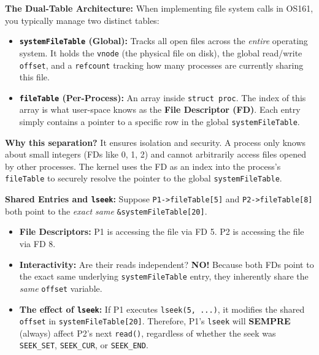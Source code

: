 \begin{tcolorbox}[colback=blue!5!white,colframe=blue!75!black,title=Exam Insight: System File Table vs User File Table (e.g. Q5 2022-06-20)]
\textbf{The Dual-Table Architecture:} When implementing file system calls in OS161, you typically manage two distinct tables:
\begin{itemize}
    \item \textbf{\texttt{systemFileTable} (Global):} Tracks all open files across the \textit{entire} operating system. It holds the \texttt{vnode} (the physical file on disk), the global read/write \texttt{offset}, and a \texttt{refcount} tracking how many processes are currently sharing this file.
    \item \textbf{\texttt{fileTable} (Per-Process):} An array inside \texttt{struct proc}. The index of this array is what user-space knows as the \textbf{File Descriptor (FD)}. Each entry simply contains a pointer to a specific row in the global \texttt{systemFileTable}.
\end{itemize}
\textbf{Why this separation?} It ensures isolation and security. A process only knows about small integers (FDs like 0, 1, 2) and cannot arbitrarily access files opened by other processes. The kernel uses the FD as an index into the process's \texttt{fileTable} to securely resolve the pointer to the global \texttt{systemFileTable}.

\textbf{Shared Entries and \texttt{lseek}:}
Suppose \texttt{P1->fileTable[5]} and \texttt{P2->fileTable[8]} both point to the \textit{exact same} \texttt{\&systemFileTable[20]}.
\begin{itemize}
    \item \textbf{File Descriptors:} P1 is accessing the file via FD 5. P2 is accessing the file via FD 8.
    \item \textbf{Interactivity:} Are their reads independent? \textbf{NO!} Because both FDs point to the exact same underlying \texttt{systemFileTable} entry, they inherently share the \textit{same} \texttt{offset} variable. 
    \item \textbf{The effect of \texttt{lseek}:} If P1 executes \texttt{lseek(5, ...)}, it modifies the shared \texttt{offset} in \texttt{systemFileTable[20]}. Therefore, P1's \texttt{lseek} will \textbf{SEMPRE} (always) affect P2's next \texttt{read()}, regardless of whether the seek was \texttt{SEEK\_SET}, \texttt{SEEK\_CUR}, or \texttt{SEEK\_END}.
\end{itemize}
\end{tcolorbox}

